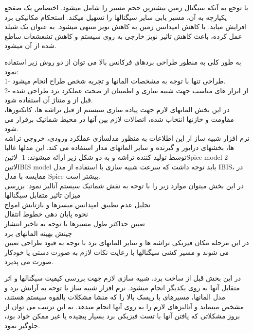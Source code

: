 با توجع به آنکه سیگنال زمین بیشترین حجم مسیر را شامل میشود. اختصاص یک صفحع یکپارچه به آن، مسیر یابی سایر سیگنالها را تسهیل میکند. 
استحکام مکانیکی برد افزایش میابد.
با کاهش امپدانس زمین به کاهش نویز منتهی میشود.
به عنوان یک شیلد عمل کرده، باعث کاهش تاثیر نویز خارجی به روی سیستم و کاهش تشعشعات ساطع شده از آن میشود.

به طور کلی به منظور طراحی بردهای فرکانس بالا می توان از دو روش زیر استفاده نمود:\\
1- طراحی تنها با توجه به مشخصات المانها و تجربه شخص طراح انجام میشود.\\
2- از ابزار های مناسب جهت شبیه سازی و اطمینان از صحت عملکرد برد طراحی شده قبل از 
و منتاژ آن استفاده شود.\\

در این بخش المانهای لازم جهت پیاده سازی سیستم از قبل تراشه ها، کانکتورها، مقاومت و خازنها انتخاب شده، اتصالات لازم بین آنها در محیط شماتیک برقرار می شود.\\
نرم افزار شبیه ساز از این اطلاعات به منظور مدلسازی عملکرد ورودی، خروجی تراشه ها، بخشهای درایور و گیرنده و سایر المانهای مدار استفاده می کند. این مدلها غالبا توسط تولید کننده تراشه و به دو شکل زیر ارائه میشوند: 1- ‌لاتین{Spice model} 2- ‌لاتین{IBIS model} باید توجه داشت که سرعت شبیه سازی با استفاده از مدل IBIS، در مقایسه با مدل Spice بیشتر است.\\
در این بخش میتوان موارد زیر را با توجه به نقش شماتیک سیستم آنالیز نمود:
بررسی میزان تاثیر متقابل سیگنالها\\
تحلیل عدم تطبیق امپدانس میسرها و بازتابش امواج\\
نحوه پایان دهی خطوط انتقال\\
تعیین حداکثر طول مسیرها با توجه به تاخیر انتشار\\
چینش بهینه المانهای برد\\

در این مرحله مکان فیزیکی تراشه ها و سایر المانهای برد با توجه به قیود طراحی تعیین می شوند و مسیر کشی سیگنالها با رعایت نکات لازم به صورت دستی یا خودکار صورت می پذیرد.

در این بخش قبل از ساخت برد، شبیه سازی لازم جهت بررسی کیفیت سیگنالها و اثر متقابل آنها به روی یکدیگر انجام میشود. نرم افزار شبیه ساز با توجه به آرایش برد و مدل المانها، مسیرهای با ریسک بالا را که منشا مشکلات بالقوه سیستم هستند، مشخص مینماید و آنالیزهای لازم را به روی آنها انجام میدهد. به این ترتیب می توان از بروز مشکلاتی که یافتن آنها با تست فیزیکی برد بسیار پیچیده یا غیر ممکن خواد بود، جلوگیر نمود.

